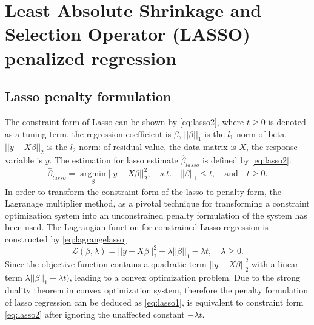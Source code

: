 \section{Least Absolute Shrinkage and Selection Operator (LASSO) penalized regression}
\subsection{Lasso penalty formulation}
The constraint form of Lasso can be shown by \autoref{eq:lasso2}, where $t \geq 0$ is denoted as a tuning term, the regression coefficient is $\beta$, $||\beta||_1$ is the $l_1$ norm of beta, $||y-X\beta||_2$ is the $l_2$ norm: of residual value, the data matrix is $X$, the response variable is $y$. The estimation for lasso estimate $\hat{\beta}_{lasso}$ is defined by \autoref{eq:lasso2}. 
\begin{equation}
	\label{eq:lasso2}
	\widehat{\beta}_{lasso} = \underset{\beta}{\operatorname{argmin}} ||y-X\beta||_2^2,  \quad s.t. \quad ||\beta||_1 \leq t,  \quad \mbox{and} \quad  t \geq 0.
\end{equation}
In order to transform the constraint form of the lasso to penalty form, the Lagranage multiplier method, as a pivotal technique for transforming a constraint optimization system into an unconstrained penalty formulation of the system has been used. The Lagrangian function for constrained Lasso regression is constructed by \autoref{eq:lagrangelasso}
\begin{equation}
	\label{eq:lagrangelasso}
	\mathcal{L}(\beta,\lambda) =  ||y-X\beta||_2^2 + \lambda||\beta||_1 - \lambda t,  \quad \lambda \geq 0.
\end{equation}
Since the objective function contains a quadratic term $||y-X\beta||_2^2$ with a linear term $\lambda||\beta||_1 - \lambda t)$, leading to a convex optimization problem. Due to the strong duality theorem in convex optimization system, therefore the penalty formulation of lasso regression can be deduced as \autoref{eq:lasso1}, is equivalent to constraint form \autoref{eq:lasso2} after ignoring the unaffected constant $-\lambda t$.

